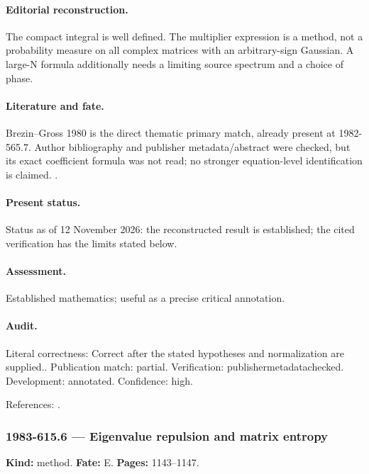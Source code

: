 \paragraph{Editorial reconstruction.} The compact integral is well defined. The multiplier expression is a method, not a probability measure on all complex matrices with an arbitrary-sign Gaussian. A large-N formula additionally needs a limiting source spectrum and a choice of phase.

\paragraph{Literature and fate.} Brezin--Gross 1980 is the direct thematic primary match, already present at 1982-565.7. Author bibliography and publisher metadata/abstract were checked, but its exact coefficient formula was not read; no stronger equation-level identification is claimed. \citep{brezingross1980external}.

\paragraph{Present status.} Status as of 12 November 2026: the reconstructed result is established; the cited verification has the limits stated below.

\paragraph{Assessment.} Established mathematics; useful as a precise critical annotation.

\paragraph{Audit.} Literal correctness: Correct after the stated hypotheses and normalization are supplied.. Publication match: partial. Verification: publishermetadatachecked. Development: annotated. Confidence: high.

\noindent References: \citep{brezingross1980external}.\par

\subsubsection{1983-615.6 --- Eigenvalue repulsion and matrix entropy}

\label{item:1983-615.6}

\noindent\textbf{Kind:} method. \textbf{Fate:} E. \textbf{Pages:} 1143--1147.\par


